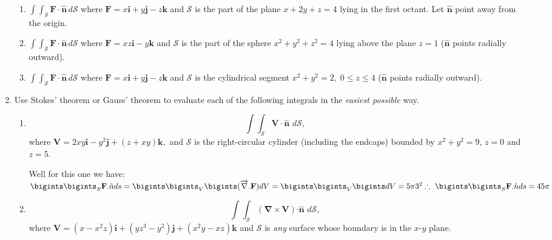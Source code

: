\documentclass[fleqn]{article}
\begin{document}
\begin{enumerate}
      \begin{enumerate}
        \item $\int \! \int_{\mathcal{S}}\mathbf{F\cdot \hat{n}}\,d\mathcal{S}$ where $\mathbf{F}=x\mathbf{i}+y\mathbf{j}-z\mathbf{k}$ and $\mathcal{S}$ is the part of the plane $x+2y+z=4$ lying in the first octant.  Let $\mathbf{\hat{n}}$ point away from the origin.
        
        \item $\int \! \int_{\mathcal{S}}\mathbf{F\cdot \hat{n}}\,d\mathcal{S}$ where $\mathbf{F}=xz\mathbf{i}-y\mathbf{k}$ and
        $\mathcal{S}$ is the part of the sphere $x^{2}+y^{2}+z^{2}=4$ lying
        above the plane $z=1$ ($\mathbf{\hat{n}}$ points radially outward).
        
        \item $\int \! \int_{\mathcal{S}}\mathbf{F\cdot \hat{n}\,}d\mathcal{S}$ where $\mathbf{F}=x\mathbf{i}+y\mathbf{j}-z\mathbf{k}$ and $\mathcal{S}$ is the cylindrical segment $x^{2}+y^{2}=2,\;0\leq z\leq 4$ ($\mathbf{\hat{n}}$ points radially outward).
      \end{enumerate}
    
    
    \item Use Stokes' theorem or Gauss' theorem to evaluate each of the following integrals in the \emph{easiest possible} way. 
      \begin{enumerate}
        \item
        \[
        \int \! \int_{\mathcal{S}}\mathbf{V\cdot \hat{n}}\,\,d\mathcal{S},
        \]
        where $\mathbf{V}=2xy\mathbf{i}-y^{2}\mathbf{j}+\left(
        z+xy\right) \mathbf{k},$ and $\mathcal{S}$ is the right-circular
        cylinder (including the endcaps) bounded by $x^{2}+y^{2}=9$, $z=0$ and
        $z=5$.

          \textcolor{hwColor}{
            Well for this one we have: \\
            $
              \bigints \bigints_S \mathbf{F}.\hat{n}ds=\bigints \bigints_V \bigints (\overrightarrow{\nabla}.\mathbf{F}) dV=\bigints \bigints_V \bigints dV=5\pi 3^2 \\
              \\
              \therefore ~ \bigints \bigints_S \mathbf{F}.\hat{n}ds=45 \pi 
            $
          }
        
        \item
        \[
        \int \! \int_{\mathcal{S}}\left( \mathbf{\nabla \times V}\right)
        \mathbf{\cdot \hat{n}\,}\,d\mathcal{S},
        \]
        where $\mathbf{V}=\left( x-x^{2}z\right) \mathbf{i}+\left(
        yz^{3}-y^{2}\right) \mathbf{j}+\left( x^{2}y-xz\right) \mathbf{k} $ and $\mathcal{S}$ is \emph{any} surface whose boundary is in the $x$-$y$ plane.
        

\end{enumerate}
\end{enumerate}
\end{document}
